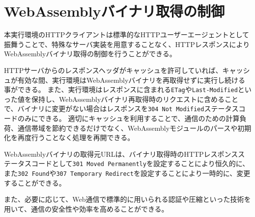 \section{WebAssemblyバイナリ取得の制御}

本実行環境のHTTPクライアントは標準的なHTTPユーザーエージェントとして振舞うことで、特殊なサーバ実装を用意することなく、HTTPレスポンスによりWebAssemblyバイナリ取得の制御を行うことができる。

HTTPサーバからのレスポンスヘッダがキャッシュを許可していれば、キャッシュが有効な間、実行環境はWebAssemblyバイナリを再取得せずに実行し続ける事ができる。
また、実行環境はレスポンスに含まれる{\tt ETag}や{\tt Last-Modified}といった値を保持し、WebAssemblyバイナリ再取得時のリクエストに含めることで、バイナリに変更がない場合はレスポンスを{\tt 304 Not Modified}ステータスコードのみにできる。
適切にキャッシュを利用することで、通信のための計算負荷、通信帯域を節約できるだけでなく、WebAssemblyモジュールのパースや初期化を再度行うことなく処理を再開できる。

WebAssemblyバイナリの取得元URLは、バイナリ取得時のHTTPレスポンスステータスコードとして{\tt 301 Moved Permanently}を設定することにより恒久的に、また{\tt 302 Found}や{\tt 307 Temporary Redirect}を設定することにより一時的に、変更することができる。

また、必要に応じて、Web通信で標準的に用いられる認証や圧縮といった技術を用いて、通信の安全性や効率を高めることができる。
